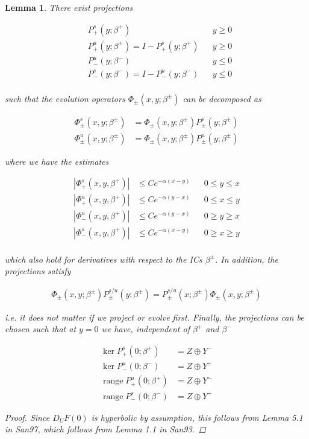 \documentclass[12pt]{article}
\DeclareMathOperator{\ran}{range}
\newtheorem{lemma}{Lemma}
\begin{document}
\begin{lemma}\label{dichotomy1}
There exist projections

\begin{align*}
&P_+^s(y; \beta^+) && y \geq 0 \\
&P_+^u(y; \beta^+) = I - P_+^s(y; \beta^+) && y \geq 0 \\
&P_-^u(y; \beta^-) && y \leq 0 \\
&P_-^s(y; \beta^-) = I - P_-^u(y; \beta^-) && y \leq 0 \\
\end{align*}

such that the evolution operators $\Phi_\pm(x, y; \beta^\pm)$ can be decomposed as

\begin{align*}
\Phi^s_\pm(x, y; \beta^\pm) &= \Phi_\pm(x, y; \beta^\pm) P^s_\pm(y; \beta^\pm) \\
\Phi^u_\pm(x, y; \beta^\pm) &= \Phi_\pm(x, y; \beta^\pm) P^u_\pm(y; \beta^\pm) 
\end{align*}

where we have the estimates

\begin{align*}
|\Phi^s_+(x, y, \beta^+)| &\leq C e^{-\alpha(x - y)} && 0 \leq y \leq x \\
|\Phi^u_+(x, y, \beta^+)| &\leq C e^{-\alpha(y - x)} && 0 \leq x \leq y \\
|\Phi^u_-(x, y, \beta^+)| &\leq C e^{-\alpha(y - x)} && 0 \geq y \geq x \\
|\Phi^s_-(x, y, \beta^+)| &\leq C e^{-\alpha(x - y)} && 0 \geq x \geq y \\
\end{align*}

which also hold for derivatives with respect to the ICs $\beta^\pm$. In addition, the projections satisfy 

\begin{align*}
\Phi_\pm(x, y; \beta^\pm) P^{s/u}_\pm(y; \beta^\pm) 
= P^{s/u}_\pm(x; \beta^\pm) \Phi_\pm(x, y; \beta^\pm)
\end{align*}

i.e. it does not matter if we project or evolve first. Finally, the projections can be chosen such that at $y = 0$ we have, independent of $\beta^+$ and $\beta^-$

\begin{align*}
\ker P^s_+(0; \beta^+) &= Z \oplus Y^- \\
\ker P^u_-(0; \beta^-) &= Z \oplus Y^+ \\
\ran P^u_+(0; \beta^+) &= Z \oplus Y^- \\
\ran P^s_-(0; \beta^-) &= Z \oplus Y^+
\end{align*}

\begin{proof}
Since $D_U F(0)$ is hyperbolic by assumption, this follows from Lemma 5.1 in San97, which follows from Lemma 1.1 in San93.
\end{proof}
\end{lemma}
\end{document}

